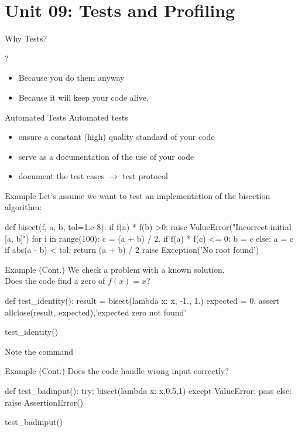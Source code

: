 \documentclass[hyperref={pdfpagelabels=false},table, handout]{beamer}
\begin{document}
\part{Unit 09: Tests and  Profiling}



\begin{frame}{Why Tests?}

\begin{center}
        {\Huge ?}
\vfill\pause
\end{center}
\begin{itemize}
        \item Because you do them \alert{anyway}
        \item Because it will keep your code \alert{alive}.
\end{itemize}
\end{frame}


\begin{frame}[fragile]{Automated Tests}
Automated tests 
\begin{itemize}
\item ensure a constant (high) quality standard of your code
\item serve as a documentation of the use of your code
\item document the test cases $\rightarrow$ test protocol
\end{itemize}
\end{frame}

\begin{frame}[fragile]{Example}
Let's assume we want to test an implementation of the bisection algorithm:
\begin{python}
def bisect(f, a, b, tol=1.e-8):
    if f(a) * f(b) >0:
       raise ValueError("Incorrect initial [a, b]")   
    for i in range(100):
        c = (a + b) / 2.
        if f(a) * f(c) <= 0:
           b = c
        else:
           a = c
        if abs(a - b) < tol:
           return (a + b) / 2
    raise Exception('No root found')   
\end{python}

\end{frame}


\begin{frame}[fragile]{Example (Cont.)}
We check a problem with a known solution.\\
Does the code find a zero of $f(x)=x$? 
\begin{python}
def test_identity():
    result = bisect(lambda x: x, -1., 1.) 
    expected = 0.
    assert allclose(result, expected),'expected zero not found'

test_identity()
\end{python}
Note the command 
\end{frame}
\begin{frame}[fragile]{Example (Cont.)}
Does the code handle wrong input correctly? \vfill
\begin{python}
def test_badinput():
  try:
    bisect(lambda x: x,0.5,1)
  except ValueError:
    pass
  else:
    raise AssertionError()

test_badinput()
\end{python}


\end{frame}
\end{document}
